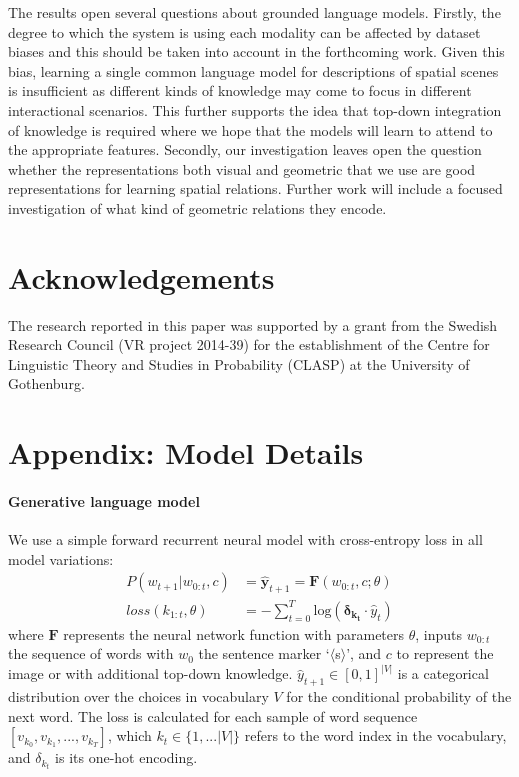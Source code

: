The results open several questions about grounded language
models. Firstly, the degree to which the system is using each modality
can be affected by dataset biases and this should be taken into
account in the forthcoming work. Given this bias, learning a single
common language model for descriptions of spatial scenes is
insufficient as different kinds of knowledge may come to focus in
different interactional scenarios. This further supports the idea that
top-down integration of knowledge is required where we hope that the
models will learn to attend to the appropriate features.  Secondly,
our investigation leaves open the question whether the representations
both visual and geometric that we use are good representations for
learning spatial relations. Further work will include a focused
investigation of what kind of geometric relations they encode.






\section*{Acknowledgements}

The research reported in this paper was supported by a grant from the
Swedish Research Council (VR project 2014-39) for the establishment of
the Centre for Linguistic Theory and Studies in Probability (CLASP) at
the University of Gothenburg.



\section{Appendix: Model Details}
\label{appendix:models}
\paragraph{Generative language model}
We use a simple forward recurrent neural model with cross-entropy loss in all model variations:
\begin{align}\label{inlg2019:eq:lm}
P(w_{t+1} | w_{0:t}, c) &= \hat{\bm{y}}_{t+1} = \bm{F}(w_{0:t}, c; \theta) \\
loss(k_{1:t},\theta) &= -\sum_{t=0}^{T}\mathrm{log}(\bm{\delta_{k_t}} \cdot \hat{y}_{t})
\end{align} 
\noindent where $\bm{F}$ represents the neural network function with parameters $\theta$, inputs $w_{0:t}$ the sequence of words with $w_0$ the sentence marker `$\langle$s$\rangle$', and $c$ to represent the image or with additional top-down knowledge. 
$\hat{y}_{t+1} \in [0,1]^{|V|}$ is a categorical distribution over the choices in vocabulary $V$ for the conditional probability of the next word. 
The loss is calculated for each sample of word sequence $[v_{k_{0}}, v_{k_{1}}, ...,v_{k_{T}}]$, which $k_t \in \{1,...|V|\}$ refers to the word index in the vocabulary, and $\delta_{k_t}$ is its one-hot encoding.

